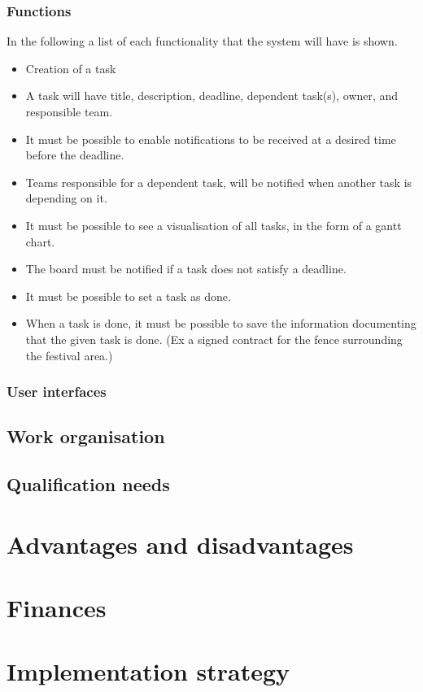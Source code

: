 \subsubsection{Functions}
In the following a list of each functionality that the system will have is shown.
\begin{itemize}
    \item Creation of a task
    \item A task will have title, description, deadline, dependent task(s), owner, and responsible
    team.
    \item It must be possible to enable notifications to be received at a desired time before the
    deadline.
    \item Teams responsible for a dependent task, will be notified when another task is depending on
    it.
    \item It must be possible to see a visualisation of all tasks, in the form of a gantt chart.
    \item The board must be notified if a task does not satisfy a deadline.
    \item It must be possible to set a task as done.
    \item When a task is done, it must be possible to save the information documenting that the
    given task is done. (Ex a signed contract for the fence surrounding the festival area.)
\end{itemize}

\subsubsection{User interfaces}

\subsection{Work organisation}
\label{sub:work_organisation}

\subsection{Qualification needs}
\label{sub:qualification_needs}

\section{Advantages and disadvantages}


\section{Finances}

\section{Implementation strategy}


